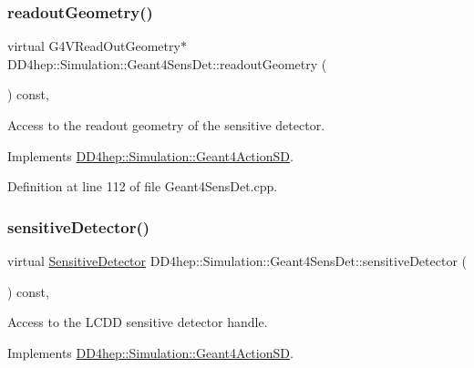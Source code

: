 \subsubsection{\texorpdfstring{readout\+Geometry()}{readoutGeometry()}}
{\footnotesize\ttfamily virtual G4\+V\+Read\+Out\+Geometry$\ast$ D\+D4hep\+::\+Simulation\+::\+Geant4\+Sens\+Det\+::readout\+Geometry (\begin{DoxyParamCaption}{ }\end{DoxyParamCaption}) const\hspace{0.3cm}{\ttfamily [inline]}, {\ttfamily [virtual]}}



Access to the readout geometry of the sensitive detector. 



Implements \hyperlink{class_d_d4hep_1_1_simulation_1_1_geant4_action_s_d_abf432e0098d25759837ddc2af5dc6c16}{D\+D4hep\+::\+Simulation\+::\+Geant4\+Action\+SD}.



Definition at line 112 of file Geant4\+Sens\+Det.\+cpp.

\hypertarget{class_d_d4hep_1_1_simulation_1_1_geant4_sens_det_ada24f1cfac58e4f10581e1855eda59f0}{}\label{class_d_d4hep_1_1_simulation_1_1_geant4_sens_det_ada24f1cfac58e4f10581e1855eda59f0} 
\subsubsection{\texorpdfstring{sensitive\+Detector()}{sensitiveDetector()}}
{\footnotesize\ttfamily virtual \hyperlink{class_d_d4hep_1_1_simulation_1_1_geant4_action_s_d_a8a292947ea3f9b419728ef729a7e3fae}{Sensitive\+Detector} D\+D4hep\+::\+Simulation\+::\+Geant4\+Sens\+Det\+::sensitive\+Detector (\begin{DoxyParamCaption}{ }\end{DoxyParamCaption}) const\hspace{0.3cm}{\ttfamily [inline]}, {\ttfamily [virtual]}}



Access to the L\+C\+DD sensitive detector handle. 



Implements \hyperlink{class_d_d4hep_1_1_simulation_1_1_geant4_action_s_d_a8b1e15e8582895a6a7ad9ce4cf169e8e}{D\+D4hep\+::\+Simulation\+::\+Geant4\+Action\+SD}.



